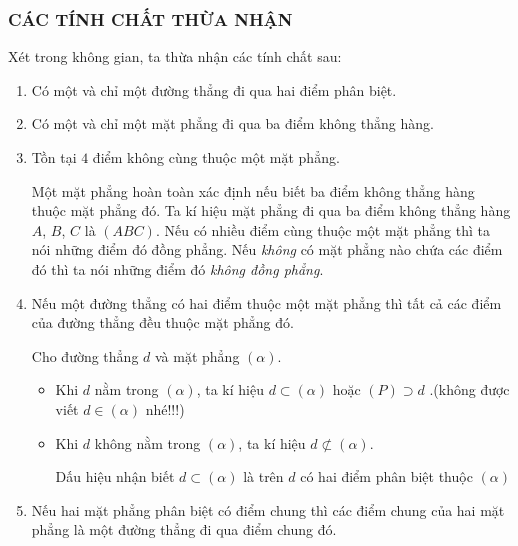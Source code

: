 \subsubsection{CÁC TÍNH CHẤT THỪA NHẬN}
Xét trong không gian, ta thừa nhận các tính chất sau:
\begin{enumerate}[\iconMT]
	\item {} Có một và chỉ một đường thẳng đi qua hai điểm phân biệt.
	\item {} Có một và chỉ một mặt phẳng đi qua ba điểm không thẳng hàng.
	\item {} Tồn tại $4$ điểm không cùng thuộc một mặt phẳng.
	\begin{tcolorbox}[colframe=\maudl,colback=cyan!3!white,boxrule=0.5mm]
		Một mặt phẳng hoàn toàn xác định nếu biết ba điểm không thẳng hàng thuộc mặt phẳng đó. Ta kí hiệu mặt phẳng đi qua ba điểm không thẳng hàng $A$, $B$, $C$ là $(A B C)$. Nếu có nhiều điểm cùng thuộc một mặt phẳng thì ta nói những điểm đó đồng phẳng. Nếu \textit{không} có mặt phẳng nào chứa các điểm đó thì ta nói những điểm đó \textit{không đồng phẳng}.
	\end{tcolorbox}
	\item {} Nếu một đường thẳng có hai điểm thuộc một mặt phẳng thì tất cả các điểm của đường thẳng đều thuộc mặt phẳng đó.\\
	\begin{tcolorbox}[colframe=\maudl,colback=cyan!3!white,boxrule=0.5mm]
		Cho đường thẳng $d$ và mặt phẳng $(\alpha)$.
		\begin{itemize}
			\item [\ding{172}] Khi $d$ nằm trong $(\alpha)$, ta kí hiệu $d \subset (\alpha)$ hoặc $(P) \supset d$ .\quad (không được viết  $d \in (\alpha)$ nhé!!!)
			\item [\ding{173}] Khi $d$ không nằm trong $(\alpha)$, ta kí hiệu $d \not\subset (\alpha)$.
			\begin{note}
				Dấu hiệu nhận biết $d \subset (\alpha)$  là trên $d$ có hai điểm phân biệt thuộc $(\alpha)$
			\end{note}
		\end{itemize}
	\end{tcolorbox}
	\item {} Nếu hai mặt phẳng phân biệt có điểm chung thì các điểm chung của hai mặt phẳng là một đường thẳng đi qua điểm chung đó.
	\immini{
	\begin{tcolorbox}[colframe=\maudl,colback=cyan!3!white,boxrule=0.5mm]

\end{tcolorbox}}
\end{enumerate}
